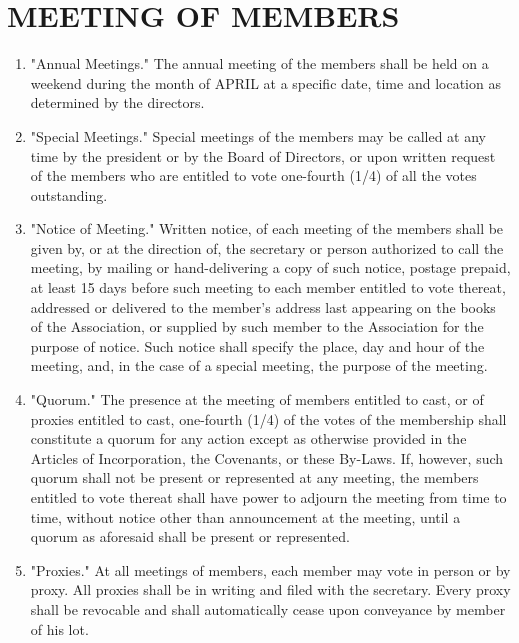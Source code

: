 \documentclass[12pt, letterpaper]{article}
\begin{document}
\section{MEETING OF MEMBERS}
\begin{enumerate}
 \item "Annual Meetings."
  The annual meeting of the members shall be held on a weekend during the month of APRIL at a specific date, time and location as determined by the directors.
 \item "Special Meetings."
  Special meetings of the members may be called at any time by the president or by the Board of Directors, or upon written request of the members who are entitled to vote one-fourth (1/4) of all the votes outstanding.
 \item "Notice of Meeting."
  Written notice, of each meeting of the members shall be given by, or at the direction of, the secretary or person authorized to call the meeting, by mailing or hand-delivering a copy of such notice, postage prepaid, at least 15 days before such meeting to each member entitled to vote thereat, addressed or delivered to the member's address last appearing on the books of the Association, or supplied by such member to the Association for the purpose of notice.
  Such notice shall specify the place, day and hour of the meeting, and, in the case of a special meeting, the purpose of the meeting.
 \item "Quorum."
  The presence at the meeting of members entitled to cast, or of proxies entitled to cast, one-fourth (1/4) of the votes of the membership shall constitute a quorum for any action except as otherwise provided in the Articles of Incorporation, the Covenants, or these By-Laws.
  If, however, such quorum shall not be present or represented at any meeting, the members entitled to vote thereat shall have power to adjourn the meeting from time to time, without notice other than announcement at the meeting, until a quorum as aforesaid shall be present or represented.
 \item "Proxies."
  At all meetings of members, each member may vote in person or by proxy.
  All proxies shall be in writing and filed with the secretary.
  Every proxy shall be revocable and shall automatically cease upon conveyance by member of his lot.
\end{enumerate}
\end{document}
